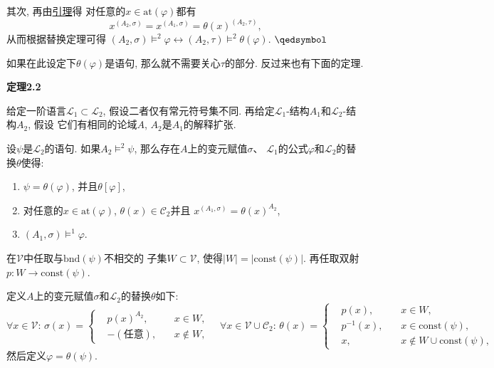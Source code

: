 其次, 再由\href{02 语言的限制与扩张#nameddest=sec:定理1.1}{引理}得
对任意的$x\in\mathrm{at}(\varphi)$都有
\[
    x^{(A_2,\sigma)}=x^{(A_1,\sigma)}=\theta(x)^{(A_2,\tau)},
\]
从而根据替换定理可得
$(A_2,\sigma)\models^2\varphi\leftrightarrow(A_2,\tau)\models^2\theta(\varphi)$.
\hfill $\qedsymbol$


\vspace{10pt}

如果在此设定下$\theta(\varphi)$是语句, 那么就不需要关心$\tau$的部分.
反过来也有下面的定理.

\vspace{10pt}

\hypertarget{sec:定理2.2}{}
\noindent\textbf{定理2.2}

给定一阶语言$\mathcal{L}_1\subset\mathcal{L}_2$, 假设二者仅有常元符号集不同.
再给定$\mathcal{L}_1$-结构$A_1$和$\mathcal{L}_2$-结构$A_2$, 假设
它们有相同的论域$A$, $A_2$是$A_1$的解释扩张.

设$\psi$是$\mathcal{L}_2$的语句. 如果$A_2\models^2\psi$,
那么存在$A$上的变元赋值$\sigma$、
$\mathcal{L}_1$的公式$\varphi$和$\mathcal{L}_2$的替换$\theta$使得:
\begin{enumerate}
    \item $\psi=\theta(\varphi)$, 并且$\theta[\varphi]$,
    \item 对任意的$x\in\mathrm{at}(\varphi)$, $\theta(x)\in\mathcal{C}_2$并且
    $x^{(A_1,\sigma)}=\theta(x)^{A_2}$,
    \item $(A_1,\sigma)\models^1\varphi$.
\end{enumerate}


在$\mathcal{V}$中任取与$\mathrm{bnd}(\psi)$不相交的
子集$W\subset\mathcal{V}$, 使得$|W|=|\mathrm{const}(\psi)|$.
再任取双射$p:W\to\mathrm{const}(\psi)$.

定义$A$上的变元赋值$\sigma$和$\mathcal{L}_2$的替换$\theta$如下:
\[\forall x\in\mathcal{V}:\,\sigma(x)=\left\{\begin{aligned}
    &p(x)^{A_2},\,&&x\in W,\\[-3pt]
    &-(\text{任意}),\,&&x\notin W,
\end{aligned}\right.\quad
\forall x\in\mathcal{V}\cup\mathcal{C}_2:\,\theta(x)=\left\{\begin{aligned}
    &p(x),\,&&x\in W,\\[-3pt]
    &p^{-1}(x),\,&&x\in\mathrm{const}(\psi),\\[-3pt]
    &x,\,&&x\notin W\cup\mathrm{const}(\psi),
\end{aligned}\right.\]
然后定义$\varphi=\theta(\psi)$.

